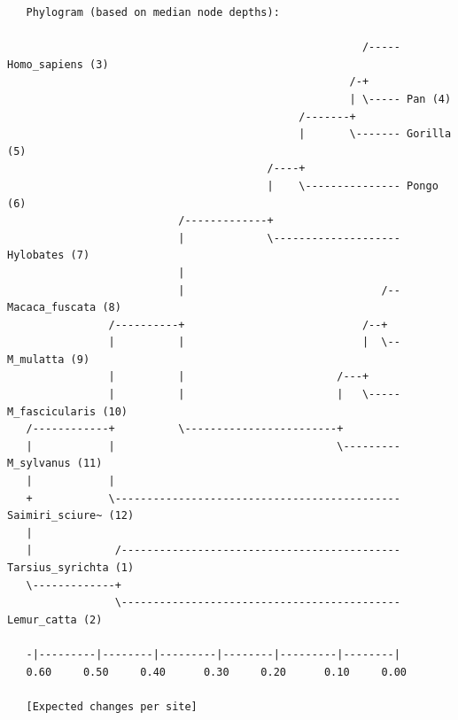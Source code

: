 \documentclass[12pt]{book}
\begin{document}
\begin{singlespacing}
\scriptsize
\begin{verbatim}
   Phylogram (based on median node depths):

                                                        /----- Homo_sapiens (3)
                                                      /-+                          
                                                      | \----- Pan (4)
                                              /-------+                            
                                              |       \------- Gorilla (5)
                                         /----+                                    
                                         |    \--------------- Pongo (6)
                           /-------------+                                         
                           |             \-------------------- Hylobates (7)
                           |                                                       
                           |                               /-- Macaca_fuscata (8)
                /----------+                            /--+                       
                |          |                            |  \-- M_mulatta (9)
                |          |                        /---+                          
                |          |                        |   \----- M_fascicularis (10)
   /------------+          \------------------------+                              
   |            |                                   \--------- M_sylvanus (11)
   |            |                                                                  
   +            \--------------------------------------------- Saimiri_sciure~ (12)
   |                                                                               
   |             /-------------------------------------------- Tarsius_syrichta (1)
   \-------------+                                                                 
                 \-------------------------------------------- Lemur_catta (2)
                                                                                   
   -|---------|--------|---------|--------|---------|--------|                     
   0.60     0.50     0.40      0.30     0.20      0.10     0.00                    

   [Expected changes per site]
\end{verbatim}
\normalsize
\end{singlespacing}
\end{document}

